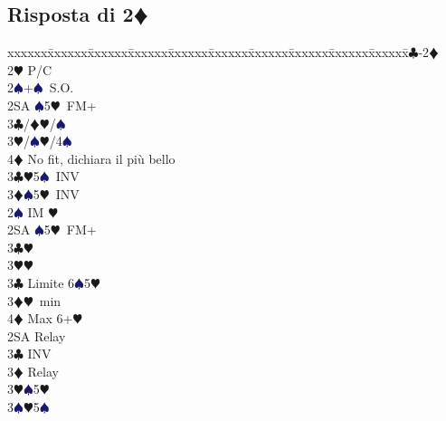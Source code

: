 \documentclass[a4paper,italian]{article}
\newcommand{\BC}{\textcolor{OliveGreen}{$\clubsuit$}}
\newcommand{\BD}{\textcolor{RedOrange}{$\vardiamondsuit$}}
\newcommand{\BH}{\textcolor{Red2}{$\varheartsuit${}}}
\newcommand{\BS}{\textcolor{MidnightBlue}{$\spadesuit${}}}
\newcommand{\pdfd}{\texorpdfstring{\BD{}}{D}}
\newenvironment{bidtable}
{\begin{tabbing}

    xxxxxx\=xxxxxx\=xxxxxx\=xxxxxx\=xxxxxx\=xxxxxx\=xxxxxx\=xxxxxx\=xxxxxx\=xxxxxx\=\kill}
{\end{tabbing} }%
\begin{document}
                                \begin{multicols}{2}
                                    \subsection{Risposta di 2\pdfd}

                                    \begin{bidtable}
                                        1\BC-2\BD\+\\
                                        2\BH \> P/C\+\\
                                        2\BS {}+\BS\ S.O.\\
                                        2SA \BS 5\BH\ FM+\+\\
                                        3\BC/\BD {}\BH /\BS \\
                                        3\BH/\BS {}\BH /4\BS \\
                                        4\BD \> No fit, dichiara il più bello\-\\
                                        3\BC {}\BH 5\BS\ INV\\
                                        3\BD {}\BS 5\BH\ INV\-\\
                                        2\BS \> IM \BH \+\\
                                        2SA \BS 5\BH\ FM+\+\\
                                        3\BC {}\BH \\
                                        3\BH {}\BH \-\\
                                        3\BC \> Limite 6\BS 5\BH \\
                                        3\BD {}\BH\ min\\
                                        4\BD \> Max 6+\BH \-\\
                                        2SA \> Relay\+\\
                                        3\BC {} INV\+\\
                                        3\BD \> Relay\+\\
                                        3\BH {}\BS 5\BH \\
                                        3\BS {}\BH 5\BS \-\\

\end{bidtable}
\end{multicols}
\end{document}
